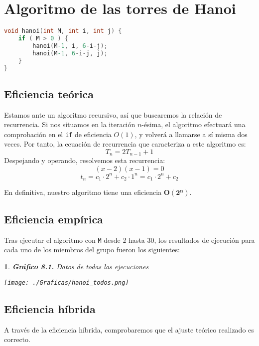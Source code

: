 \documentclass[10pt, a4paper]{article}
\theoremstyle{theorem-style}
\newtheorem*{datos}{}
\theoremstyle{theorem-style}
\theoremstyle{definition-style}
\theoremstyle{remark-style}
\theoremstyle{example-style}
\theoremstyle{definition-style}
\theoremstyle{remark-style}
\begin{document}
\section{Algoritmo de las torres de Hanoi}

\begin{lstlisting}[language=C]
void hanoi(int M, int i, int j) {
	if ( M > 0 ) {
		hanoi(M-1, i, 6-i-j);
		hanoi(M-1, 6-i-j, j);
	}
}
\end{lstlisting}

\subsection{Eficiencia teórica}

Estamos ante un algoritmo recursivo, así que buscaremos la relación de recurrencia. Si nos situamos en la iteración $n$-ésima, el algoritmo efectuará una comprobación en el \texttt{if} de eficiencia $O(1)$, y volverá a llamarse a sí misma dos veces. Por tanto, la ecuación de recurrencia que caracteriza a este algoritmo es:
$$ T_n=2T_{n-1}+1$$
Despejando y operando, resolvemos esta recurrencia:
$$ (x-2)(x-1)=0 $$
$$ t_n=c_1\cdot 2^n + c_2 \cdot 1^n = c_1 \cdot 2^n + c_2$$

En definitiva, nuestro algoritmo tiene una eficiencia $\boldsymbol{O(2^n)}$.


\subsection{Eficiencia empírica}

Tras ejecutar el algoritmo con \texttt{M} desde 2 hasta 30, los resultados de ejecución para cada uno de los miembros del grupo fueron los siguientes:
\pagebreak
\begin{datos}\hspace{-0.2cm}
	{\bf\sffamily Gráfico 8.1.} {\sffamily Datos de todas las ejecuciones}\\
	\vspace{-0.7cm}
	\begin{center}
		\texttt{[image: ./Graficas/hanoi\_todos.png]}
	\end{center}
\end{datos}

\subsection{Eficiencia híbrida}

A través de la eficiencia híbrida, comprobaremos que el ajuste teórico realizado es correcto.
\end{document}
